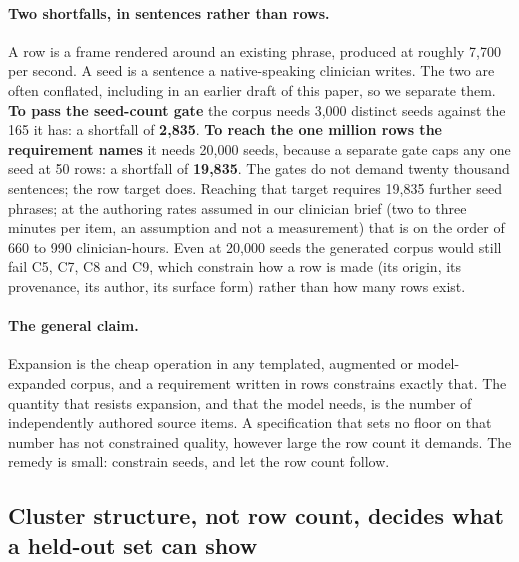 

\paragraph{Two shortfalls, in sentences rather than rows.} A row is a frame
rendered around an existing phrase, produced at roughly 7{,}700 per second. A
seed is a sentence a native-speaking clinician writes. The two are often
conflated, including in an earlier draft of this paper, so we separate them.
\textbf{To pass the seed-count gate} the corpus needs 3{,}000 distinct seeds
against the 165 it has: a shortfall of \textbf{2{,}835}. \textbf{To reach the
one million rows the requirement names} it needs 20{,}000 seeds, because a
separate gate caps any one seed at 50 rows: a shortfall of \textbf{19{,}835}.
The gates do not demand twenty thousand sentences; the row target does. Reaching
that target requires 19{,}835 further seed phrases; at the authoring rates assumed in
our clinician brief (two to three minutes per item, an assumption and not a
measurement) that is on the order of 660 to 990 clinician-hours. Even at
20{,}000 seeds the generated corpus would still fail C5, C7, C8 and C9, which
constrain how a row is made (its origin, its provenance, its author, its
surface form) rather than how many rows exist.

\paragraph{The general claim.} Expansion is the cheap operation in any templated,
augmented or model-expanded corpus, and a requirement written in rows constrains
exactly that. The quantity that resists expansion, and that the model needs, is
the number of independently authored source items. A specification that sets no
floor on that number has not constrained quality, however large the row count it
demands. The remedy is small: constrain seeds, and let the row count follow.


\subsection{Cluster structure, not row count, decides what a held-out set can show}
\label{sec:res:eval}

